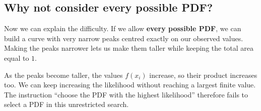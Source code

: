\documentclass[a4paper,12pt,oneside]{report}
\begin{document}
\subsection{Why not consider every possible PDF?}
\label{sec:unrestricted-density-likelihood}

Now we can explain the difficulty. If we allow \textbf{every
possible PDF}, we can build a curve with very narrow peaks
centred exactly on our observed values. Making the peaks narrower
lets us make them taller while keeping the total area equal to $1$.

As the peaks become taller, the values $f(x_i)$ increase, so
their product increases too. We can keep increasing the likelihood
without reaching a largest finite value. The instruction
``choose the PDF with the highest likelihood'' therefore fails
to select a PDF in this unrestricted search.
\end{document}
